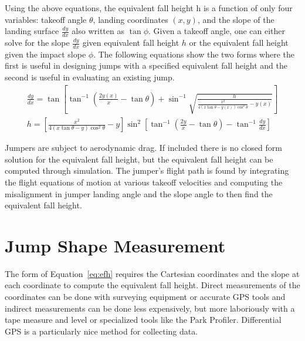 \documentclass{article}
\begin{document}
Using the above equations, the equivalent fall height h is a function of only
four variables: takeoff angle $\theta$, landing coordinates $(x, y)$, and the slope of
the landing surface $\frac{dy}{dx}$ also written as $\tan\phi$. Given a takeoff
angle, one can either solve for the slope $\frac{dy}{dx}$ given equivalent fall
height $h$ or the equivalent fall height given the impact slope $\phi$. The
following equations show the two forms where the first is useful in designing
jumps with a specified equivalent fall height and the second is useful in
evaluating an existing jump.
%
\begin{align}
  \frac{dy}{dx} = \tan\left[\tan^{-1}\left(\frac{2y(x)}{x} - \tan\theta\right) +
    \sin^{-1}\sqrt{\frac{h}{\frac{x^2}{4(x\tan\theta -
    y(x))\cos^{2}\theta} - y(x)}}\right] \\
  h = \left[\frac{x^2}{4(x\tan\theta - y)\cos^{2}\theta} -
    y\right]\sin^{2}\left[\tan^{-1}\left(\frac{2y}{x}- \tan\theta\right)- \tan^{-1}\frac{dy}{dx}\right]
  \label{eq:efh}
\end{align}

Jumpers are subject to aerodynamic drag. If included there is no closed form
solution for the equivalent fall height, but the equivalent fall height can be
computed through simulation. The jumper's flight path is found by integrating
the flight equations of motion at various takeoff velocities and computing the
misalignment in jumper landing angle and the slope angle to then find the
equivalent fall height.




\section{Jump Shape Measurement}
%
The form of Equation~\ref{eq:efh} requires the Cartesian coordinates and the
slope at each coordinate to compute the equivalent fall height. Direct
measurements of the coordinates can be done with surveying equipment or
accurate GPS tools and indirect measurements can be done less expensively, but
more laboriously with a tape measure and level or specialized tools like the
Park Profiler. Differential GPS is a particularly nice method for collecting
data.
\end{document}

